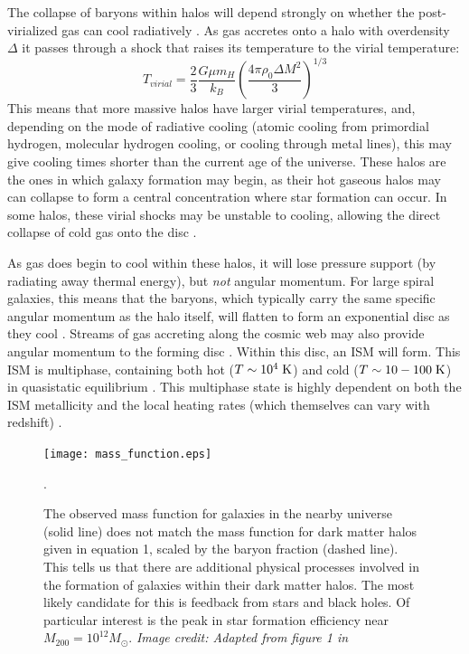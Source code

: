 The collapse of baryons within halos will depend strongly on whether the
post-virialized gas can cool radiatively \citep{Rees1977}.  As gas accretes onto
a halo with overdensity $\Delta$ it passes through a shock that raises its
temperature to the virial temperature:
\begin{equation}
    T_{virial} = \frac{2}{3}\frac{G\mu m_H}{k_B}\left({\frac{4\pi\rho_0\Delta
    M^2}{3}}\right)^{1/3}
\end{equation}
This means that more massive halos have larger virial temperatures, and,
depending on the mode of radiative cooling (atomic cooling from primordial
hydrogen, molecular hydrogen cooling, or cooling through metal lines), this may
give cooling times shorter than the current age of the universe.  These halos 
are the ones in which galaxy formation may begin, as their hot gaseous halos may
can collapse to form a central concentration where star formation can occur.  In some halos,
these virial shocks may be unstable to cooling, allowing the direct collapse of
cold gas onto the disc \citep{Birnboim2003}.  


As gas does begin to cool within these halos, it will lose pressure support (by
radiating away thermal energy), but {\it not} angular momentum.  For large
spiral galaxies, this means that the baryons, which typically carry the same
specific angular momentum as the halo itself, will flatten to form an
exponential disc as they cool \citep{Fall1980,Mo1998}.  Streams of gas
accreting along the cosmic web may also provide angular momentum to the forming
disc \citep{Dekel2006}.  Within this disc, an ISM will form.  This ISM is
multiphase, containing both hot ($T\sim10^4\;\rm{K}$) and cold
($T\sim10-100\;\rm{K}$) in quasistatic equilibrium \citep{McKee1977}.  This
multiphase state is highly dependent on both the ISM metallicity and the local
heating rates (which themselves can vary with redshift)
\citep{Field1969,Wolfire1995,Norman1997}.
\begin{figure}
    \texttt{[image: mass\_function.eps]}
    \caption[Galaxy mass function]{The observed mass function for galaxies in
    the nearby universe (solid line) does not match the mass function for dark
    matter halos given in equation 1, scaled by the baryon fraction (dashed
    line).  This tells us that there are additional physical processes involved
    in the formation of galaxies within their dark matter halos.  The most
    likely candidate for this is feedback from stars and black holes.  Of
    particular interest is the peak in star formation efficiency near
    $M_{200}=10^{12}M_\odot$.  \textit{Image credit: Adapted from figure 1 in
    \citet{Ferrero2012}}}.
\end{figure}

